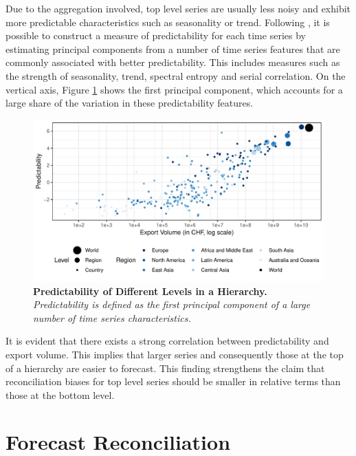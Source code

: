 \documentclass[a4paper,fleqn,11pt]{article}
\begin{document}
Due to the aggregation involved, top level series are usually less noisy and exhibit more predictable characteristics such as seasonality or trend. Following \cite{Kang2017}, it is possible to construct a measure of predictability for each time series by estimating principal components from a number of time series features that are commonly associated with better predictability. This includes measures such as the strength of seasonality, trend, spectral entropy and serial correlation.  On the vertical axis, Figure \ref{fig:feature} shows the first principal component, which accounts for a large share of the variation in these predictability features.
\begin{figure}[H]
	\includegraphics[width=\textwidth]{fig/fig_confetti}
	\caption[Predictability of Different Levels in a Hierarchy]{\textbf{Predictability of Different Levels in a Hierarchy.}\textit{ Predictability is defined as the first principal component of a large number of time series characteristics.}} \label{fig:feature}
\end{figure}
It is evident that there exists a strong correlation between predictability and export volume. This implies that larger series and consequently those at the top of a hierarchy are easier to forecast. This finding strengthens the claim that reconciliation biases for top level series should be smaller in relative terms than those at the bottom level.\\

\section{Forecast Reconciliation}
\label{sec:methods}
\end{document}
